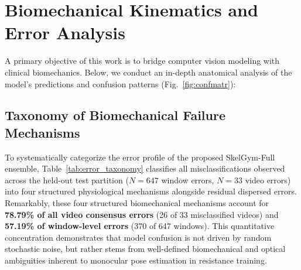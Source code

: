 \documentclass[preprint,12pt]{elsarticle}
\begin{document}
\section{Biomechanical Kinematics and Error Analysis}
\label{sec:biomechanical_analysis}

A primary objective of this work is to bridge computer vision modeling with clinical biomechanics. Below, we conduct an in-depth anatomical analysis of the model's predictions and confusion patterns (Fig.~\ref{fig:confmatr}):

\subsection{Taxonomy of Biomechanical Failure Mechanisms}
To systematically categorize the error profile of the proposed SkelGym-Full ensemble, Table~\ref{tab:error_taxonomy} classifies all misclassifications observed across the held-out test partition ($N=647$ window errors, $N=33$ video errors) into four structured physiological mechanisms alongside residual dispersed errors. Remarkably, these four structured biomechanical mechanisms account for \textbf{78.79\% of all video consensus errors} (26 of 33 misclassified videos) and \textbf{57.19\% of window-level errors} (370 of 647 windows). This quantitative concentration demonstrates that model confusion is not driven by random stochastic noise, but rather stems from well-defined biomechanical and optical ambiguities inherent to monocular pose estimation in resistance training.
\end{document}
